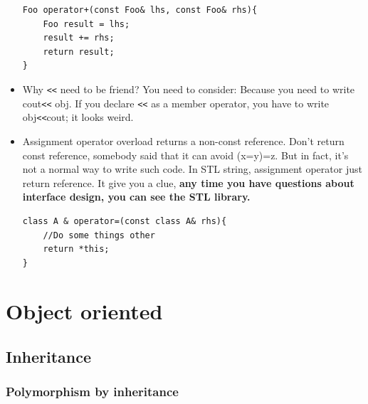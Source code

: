 \documentclass[a4paper,11pt,twoside]{book}
\begin{document}
\begin{itemize}
\begin{lstlisting}[numbers=none]
Foo operator+(const Foo& lhs, const Foo& rhs){
	Foo result = lhs;
	result += rhs;
	return result;
}
\end{lstlisting}
	
	\item Why \verb=<<= need to be friend? You need to consider:  Because you need to write cout\verb=<<= obj. If you declare \verb=<<= as a member operator, you have to write obj\verb=<<=cout; it looks weird.
	
	\item Assignment operator overload returns a non-const reference. Don't return const reference, somebody said that it can avoid (x=y)=z. But in fact, it's not a normal way to write such code. In STL string, assignment operator just return reference. It give you a clue, \textbf{any time you have questions about interface design, you can see the STL library.}
\begin{lstlisting}[numbers=none]
class A & operator=(const class A& rhs){	
	//Do some things other
	return *this;
}
\end{lstlisting}
	
\end{itemize}


\section{Object oriented}

\subsection{Inheritance}
\subsubsection{Polymorphism by inheritance}
\end{document}
